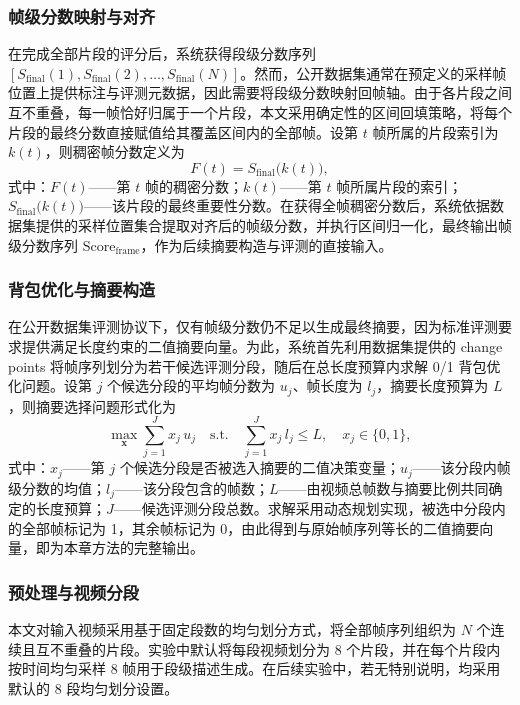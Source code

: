 \subsubsection{帧级分数映射与对齐}
在完成全部片段的评分后，系统获得段级分数序列 $[S_{\mathrm{final}}(1),S_{\mathrm{final}}(2),\dots,S_{\mathrm{final}}(N)]$。然而，公开数据集通常在预定义的采样帧位置上提供标注与评测元数据，因此需要将段级分数映射回帧轴。由于各片段之间互不重叠，每一帧恰好归属于一个片段，本文采用确定性的区间回填策略，将每个片段的最终分数直接赋值给其覆盖区间内的全部帧。设第 $t$ 帧所属的片段索引为 $k(t)$，则稠密帧分数定义为
\begin{equation}
  F(t)=S_{\mathrm{final}}\big(k(t)\big),
\end{equation}
式中：$F(t)$——第 $t$ 帧的稠密分数；$k(t)$——第 $t$ 帧所属片段的索引；$S_{\mathrm{final}}\big(k(t)\big)$——该片段的最终重要性分数。在获得全帧稠密分数后，系统依据数据集提供的采样位置集合提取对齐后的帧级分数，并执行区间归一化，最终输出帧级分数序列 $\mathrm{Score}_{\mathrm{frame}}$，作为后续摘要构造与评测的直接输入。

\subsubsection{背包优化与摘要构造}
在公开数据集评测协议下，仅有帧级分数仍不足以生成最终摘要，因为标准评测要求提供满足长度约束的二值摘要向量。为此，系统首先利用数据集提供的 change points 将帧序列划分为若干候选评测分段，随后在总长度预算内求解 0/1 背包优化问题。设第 $j$ 个候选分段的平均帧分数为 $u_j$、帧长度为 $l_j$，摘要长度预算为 $L$，则摘要选择问题形式化为
\begin{equation}
	\max_{\mathbf{x}} \sum_{j=1}^{J} x_j\, u_j \quad
	\text{s.t.} \quad \sum_{j=1}^{J} x_j\, l_j \le L, \quad x_j \in \{0,1\},
\end{equation}
式中：$x_j$——第 $j$ 个候选分段是否被选入摘要的二值决策变量；$u_j$——该分段内帧级分数的均值；$l_j$——该分段包含的帧数；$L$——由视频总帧数与摘要比例共同确定的长度预算；$J$——候选评测分段总数。求解采用动态规划实现，被选中分段内的全部帧标记为 1，其余帧标记为 0，由此得到与原始帧序列等长的二值摘要向量，即为本章方法的完整输出。


\subsubsection{预处理与视频分段}
本文对输入视频采用基于固定段数的均匀划分方式，将全部帧序列组织为 $N$ 个连续且互不重叠的片段。实验中默认将每段视频划分为 8 个片段，并在每个片段内按时间均匀采样 8 帧用于段级描述生成。在后续实验中，若无特别说明，均采用默认的 8 段均匀划分设置。

